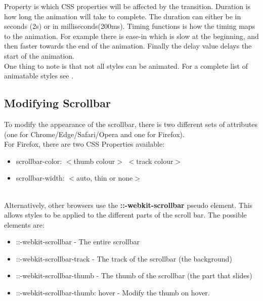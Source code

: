 \documentclass[portfolio.tex]{subfiles}
\begin{document}
				Property is which CSS properties will be affected by the transition. Duration is how long the animation will take to complete. The duration can either be in seconds (2s) or in milliseconds(200ms). Timing functions is how the timing maps to the animation. For example there is ease-in which is slow at the beginning, and then faster towards the end of the animation. Finally the delay value delays the start of the animation. \autocite{mozilla-transitions}\\

				One thing to note is that  not all styles can be animated. For a complete list of animatable styles see \autocite{possible-transitions}.\\

			\subsection{Modifying Scrollbar}
				\label{css-scrollbar}

				To modify the appearance of the scrollbar, there is two different sets of attributes (one for Chrome/Edge/Safari/Opera and one for Firefox).\\

				For Firefox, there are two CSS Properties available:
				\begin{itemize}
					\item scrollbar-color: $<$thumb colour$>$ $<$track colour$>$
					\item scrollbar-width: $<$auto, thin or none$>$
				\end{itemize}
				\autocite{modify-scroll-mozilla}\\

				Alternatively, other browsers use the \textbf{::-webkit-scrollbar} pseudo element. This allows styles to be applied to the different parts of the scroll bar. The possible elements are:

				\begin{itemize}
					\item ::-webkit-scrollbar - The entire scrollbar
					\item ::-webkit-scrollbar-track - The track of the scrollbar (the background)
					\item ::-webkit-scrollbar-thumb - The thumb of the scrollbar (the part that slides)
					\item ::-webkit-scrollbar-thumb: hover - Modify the thumb on hover.
				\end{itemize}
				\autocite{modify-scroll}
\end{document}
